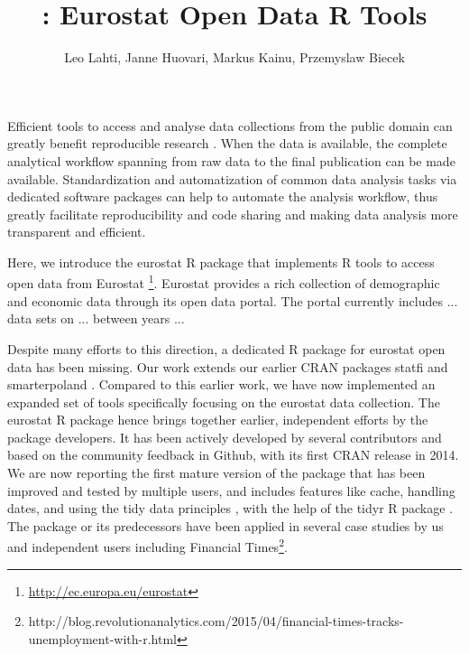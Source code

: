 \title{: Eurostat Open Data R Tools}
\author{Leo Lahti, Janne Huovari, Markus Kainu, Przemyslaw Biecek}

\maketitle


Efficient tools to access and analyse data collections from the public
domain can greatly benefit reproducible research \citep{Gandrud13,
Boettiger2015}. When the data is available, the complete analytical
workflow spanning from raw data to the final publication can be made
available. Standardization and automatization of common data analysis
tasks via dedicated software packages can help to automate the
analysis workflow, thus greatly facilitate reproducibility and code
sharing and making data analysis more transparent and efficient.

Here, we introduce the eurostat R package that implements R tools to
access open data from
Eurostat \footnote{\url{http://ec.europa.eu/eurostat}}. Eurostat
provides a rich collection of demographic and economic data through
its open data portal. The portal currently includes ... data sets on
... between years ...

Despite many efforts to this direction, a dedicated R package for
eurostat open data has been missing. Our work extends our earlier CRAN
packages statfi \citep{statfi} and smarterpoland
\citep{smarterpoland}. Compared to this earlier work, we have now
implemented an expanded set of tools specifically focusing on the
eurostat data collection. The eurostat R package hence brings together
earlier, independent efforts by the package developers. It has been
actively developed by several contributors and based on the community
feedback in Github, with its first CRAN release in 2014. We are now
reporting the first mature version of the package that has been
improved and tested by multiple users, and includes features like
cache, handling dates, and using the tidy data
principles \citep{wickham2014}, with the help of the tidyr R
package \citep{tidyr}. The package or its predecessors have been
applied in several case studies by us and independent users including
Financial
Times\footnote{http://blog.revolutionanalytics.com/2015/04/financial-times-tracks-unemployment-with-r.html}.

